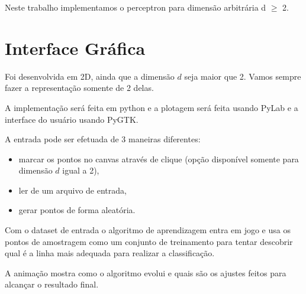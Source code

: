 \documentclass[brazil, a4paper]{article}
\begin{document}
Neste trabalho implementamos o perceptron para dimensão arbitrária d $\ge$ 2.

\section{Interface Gráfica}

Foi desenvolvida em 2D, ainda que a dimensão $d$ seja maior que 2. Vamos sempre
fazer a representação somente de 2 delas.

A implementação será feita em python e a plotagem será feita usando PyLab e a
interface do usuário usando PyGTK.

A entrada pode ser efetuada de 3 maneiras diferentes:
\begin{itemize}

	\item marcar os pontos no canvas através de clique (opção disponível somente
	para dimensão $d$ igual a 2),

	\item ler de um arquivo de entrada,

	\item gerar pontos de forma aleatória.

\end{itemize}

Com o dataset de entrada o algoritmo de aprendizagem entra em jogo e usa os
pontos de amostragem como um conjunto de treinamento para tentar descobrir qual
é a linha mais adequada para realizar a classificação.

A animação mostra como o algoritmo evolui e quais são os ajustes feitos para
alcançar o resultado final.
\end{document}
